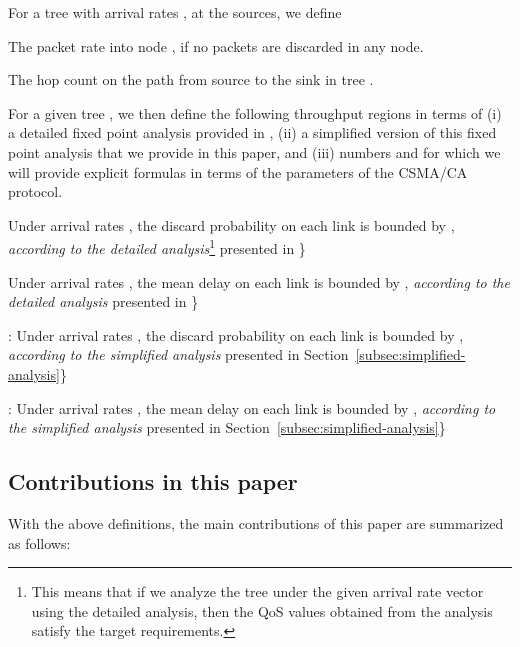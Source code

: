 \documentclass[12pt, draftclsnofoot, onecolumn]{IEEEtran}
\begin{document}
For a tree  with arrival rates , at the sources, we define 
\begin{description}
\item  The packet rate into node , if no packets are discarded in any node.
\item  The hop count on the path from source  to the sink in tree .
\end{description}  

\vspace{1mm}
For a given tree , we then define the following throughput regions in terms of (i) a detailed fixed point analysis provided in \cite{srivastava}, (ii) a simplified version of this fixed point analysis that we provide in this paper, and (iii) numbers  and  for which we will provide explicit formulas in terms of the parameters of the CSMA/CA protocol.

\begin{description}
\item  Under arrival rates , the discard probability on each link is bounded by , \emph{according to the detailed analysis}\footnote{This means that if we analyze the tree  under the given arrival rate vector  using the detailed analysis, then the QoS values obtained from the analysis satisfy the target requirements.} presented in \cite{srivastava}\}

\item  Under arrival rates , the mean delay on each link is bounded by , \emph{according to the detailed analysis} presented in \cite{srivastava}\}

\item 

\item : Under arrival rates , the discard probability on each link is bounded by , \emph{according to the simplified analysis} presented in Section~\ref{subsec:simplified-analysis}\}

\item : Under arrival rates , the mean delay on each link is bounded by , \emph{according to the simplified analysis} presented in Section~\ref{subsec:simplified-analysis}\}

\item 

\item   

\item  
\end{description}

\subsection{Contributions in this paper}
\label{subsec:contributions}
With the above definitions, the main contributions of this paper are summarized as follows: 
\end{document}
